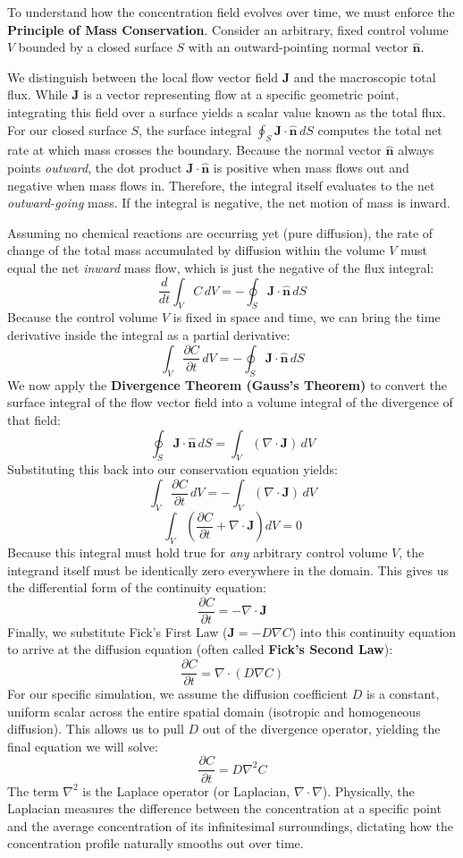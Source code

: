 \documentclass[12pt,a4paper]{article}
\begin{document}
To understand how the concentration field evolves over time, we must enforce the \textbf{Principle of Mass Conservation}. Consider an arbitrary, fixed control volume $V$ bounded by a closed surface $S$ with an outward-pointing normal vector $\mathbf{\hat{n}}$. 

We distinguish between the local flow vector field $\mathbf{J}$ and the macroscopic total flux. While $\mathbf{J}$ is a vector representing flow at a specific geometric point, integrating this field over a surface yields a scalar value known as the total flux. For our closed surface $S$, the surface integral $\oint_S \mathbf{J} \cdot \mathbf{\hat{n}} \, dS$ computes the total net rate at which mass crosses the boundary. Because the normal vector $\mathbf{\hat{n}}$ always points \textit{outward}, the dot product $\mathbf{J} \cdot \mathbf{\hat{n}}$ is positive when mass flows out and negative when mass flows in. Therefore, the integral itself evaluates to the net \textit{outward-going} mass. If the integral is negative, the net motion of mass is inward.

Assuming no chemical reactions are occurring yet (pure diffusion), the rate of change of the total mass accumulated by diffusion within the volume $V$ must equal the net \textit{inward} mass flow, which is just the negative of the flux integral:
$$\frac{d}{dt} \int_V C \, dV = - \oint_S \mathbf{J} \cdot \mathbf{\hat{n}} \, dS$$
Because the control volume $V$ is fixed in space and time, we can bring the time derivative inside the integral as a partial derivative:
$$\int_V \frac{\partial C}{\partial t} \, dV = - \oint_S \mathbf{J} \cdot \mathbf{\hat{n}} \, dS$$
We now apply the \textbf{Divergence Theorem (Gauss's Theorem)} to convert the surface integral of the flow vector field into a volume integral of the divergence of that field:
$$\oint_S \mathbf{J} \cdot \mathbf{\hat{n}} \, dS = \int_V (\nabla \cdot \mathbf{J}) \, dV$$
Substituting this back into our conservation equation yields:
$$\int_V \frac{\partial C}{\partial t} \, dV = - \int_V (\nabla \cdot \mathbf{J}) \, dV$$
$$\int_V \left( \frac{\partial C}{\partial t} + \nabla \cdot \mathbf{J} \right) dV = 0$$
Because this integral must hold true for \textit{any} arbitrary control volume $V$, the integrand itself must be identically zero everywhere in the domain. This gives us the differential form of the continuity equation:
$$\frac{\partial C}{\partial t} = - \nabla \cdot \mathbf{J}$$
Finally, we substitute Fick's First Law ($\mathbf{J} = -D \nabla C$) into this continuity equation to arrive at the diffusion equation (often called \textbf{Fick's Second Law}):
$$\frac{\partial C}{\partial t} = \nabla \cdot (D \nabla C)$$
For our specific simulation, we assume the diffusion coefficient $D$ is a constant, uniform scalar across the entire spatial domain (isotropic and homogeneous diffusion). This allows us to pull $D$ out of the divergence operator, yielding the final equation we will solve:
$$\frac{\partial C}{\partial t} = D \nabla^2 C$$
The term $\nabla^2$ is the Laplace operator (or Laplacian, $\nabla \cdot \nabla$). Physically, the Laplacian measures the difference between the concentration at a specific point and the average concentration of its infinitesimal surroundings, dictating how the concentration profile naturally smooths out over time.
\end{document}
